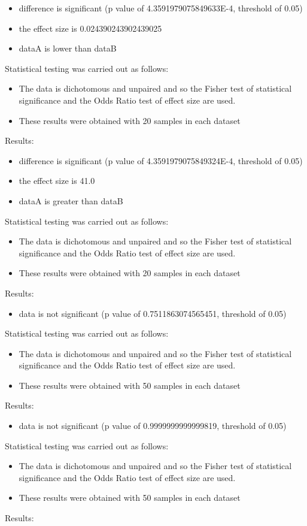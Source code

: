 \documentclass[]{article}
\begin{document}
\begin{itemize}
\item{difference is significant (p value of 4.3591979075849633E-4, threshold of 0.05)}
\item{the effect size is 0.024390243902439025}
\item{dataA is lower than dataB}
\end{itemize}Statistical testing was carried out as follows: \begin{itemize}
\item{The data is dichotomous and unpaired and so the Fisher test of statistical significance and the Odds Ratio test of effect size are used.}
\item{These results were obtained with 20 samples in each dataset}
\end{itemize}Results:
\begin{itemize}
\item{difference is significant (p value of 4.3591979075849324E-4, threshold of 0.05)}
\item{the effect size is 41.0}
\item{dataA is greater than dataB}
\end{itemize}Statistical testing was carried out as follows: \begin{itemize}
\item{The data is dichotomous and unpaired and so the Fisher test of statistical significance and the Odds Ratio test of effect size are used.}
\item{These results were obtained with 20 samples in each dataset}
\end{itemize}Results:
\begin{itemize}
\item{data is not significant (p value of 0.7511863074565451, threshold of 0.05)}
\end{itemize}Statistical testing was carried out as follows: \begin{itemize}
\item{The data is dichotomous and unpaired and so the Fisher test of statistical significance and the Odds Ratio test of effect size are used.}
\item{These results were obtained with 50 samples in each dataset}
\end{itemize}Results:
\begin{itemize}
\item{data is not significant (p value of 0.9999999999999819, threshold of 0.05)}
\end{itemize}Statistical testing was carried out as follows: \begin{itemize}
\item{The data is dichotomous and unpaired and so the Fisher test of statistical significance and the Odds Ratio test of effect size are used.}
\item{These results were obtained with 50 samples in each dataset}
\end{itemize}Results:
\end{document}
